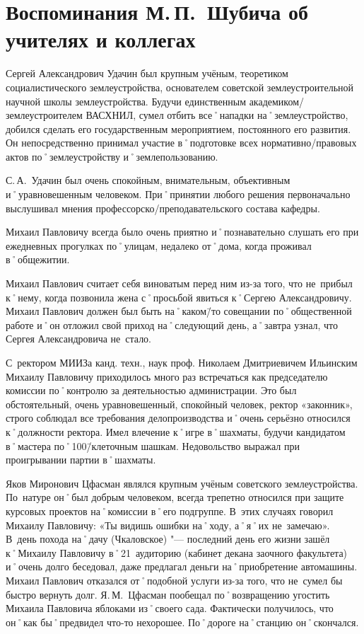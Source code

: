 ﻿\chapter[Воспоминания об учителях и коллегах]{Воспоминания М.\,П.~Шубича об учителях и коллегах}

Сергей Александрович Удачин был крупным учёным, теоретиком социалистического землеустройства, основателем советской землеустроительной научной школы землеустройства. Будучи единственным академиком\-/землеустроителем ВАСХНИЛ, сумел отбить все˚нападки на˚землеустройство, добился сделать его государственным мероприятием, постоянного его развития. Он непосредственно принимал участие в˚подготовке всех нормативно\-/правовых актов по˚землеустройству и˚землепользованию. 

С.\,А.~Удачин был очень спокойным, внимательным, объективным и˚уравновешенным человеком. При˚принятии любого решения первоначально выслушивал мнения профессорско\-/преподавательского состава кафедры. 

Михаил Павловичу всегда было очень приятно и˚познавательно слушать его при ежедневных прогулках по˚улицам, недалеко от˚дома, когда проживал в˚общежитии.

Михаил Павлович считает себя виноватым перед ним из-за того, что не~прибыл к˚нему, когда позвонила жена с˚просьбой явиться к˚Сергею Александровичу. Михаил Павлович должен был быть на˚каком\=/то совещании по˚общественной работе и˚он отложил свой приход на˚следующий день, а˚завтра узнал, что Сергея Александровича не~стало.

С~ректором МИИЗа канд. техн., наук проф. Николаем Дмитриевичем Ильинским Михаилу Павловичу приходилось много раз встречаться как председателю комиссии по˚контролю за  деятельностью администрации. Это был обстоятельный, очень уравновешенный, спокойный человек, ректор «законник», строго соблюдал все требования делопроизводства и˚очень серьёзно относился к˚должности ректора. Имел влечение к˚игре в˚шахматы, будучи кандидатом в˚мастера по˚100\=/клеточным шашкам. Недовольство выражал при проигрывании партии в˚шахматы.

Яков Миронович Цфасман являлся крупным учёным советского землеустройства. По~натуре он˚был добрым человеком, всегда трепетно относился при защите курсовых проектов на˚комиссии в˚его подгруппе. В~этих случаях говорил Михаилу Павловичу: «Ты видишь ошибки на˚ходу, а˚я˚их не~замечаю». В~день похода на˚дачу (Чкаловское) "--- последний день его жизни зашёл к˚Михаилу Павловичу в˚21~аудиторию (кабинет декана заочного факультета) и˚очень долго беседовал, даже предлагал деньги на˚приобретение автомашины. Михаил Павлович отказался от˚подобной услуги из-за того, что не~сумел бы быстро вернуть долг. Я.\,М.~Цфасман пообещал по˚возвращению угостить Михаила Павловича яблоками из˚своего сада. Фактически получилось, что он˚как бы˚предвидел что-то нехорошее. По˚дороге на˚станцию он˚скончался.

